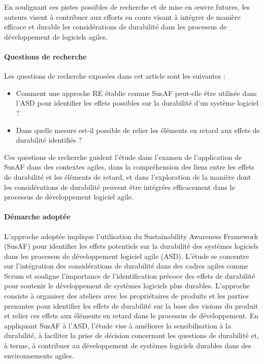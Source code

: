 En soulignant ces pistes possibles de recherche et de mise en œuvre futures, les auteurs visent à contribuer aux efforts en cours visant à intégrer de manière efficace et durable les considérations de durabilité dans les processus de développement de logiciels agiles.

\paragraph{Questions de recherche}
Les questions de recherche exposées dans cet article sont les suivantes :

\begin{itemize}
    \item Comment une approche RE établie comme SusAF peut-elle être utilisée dans l'ASD pour identifier les effets possibles sur la durabilité d'un système logiciel ?
    \item Dans quelle mesure est-il possible de relier les éléments en retard aux effets de durabilité identifiés ?
\end{itemize}

Ces questions de recherche guident l'étude dans l'examen de l'application de SusAF dans des contextes agiles, dans la compréhension des liens entre les effets de durabilité et les éléments de retard, et dans l'exploration de la manière dont les considérations de durabilité peuvent être intégrées efficacement dans le processus de développement logiciel agile.

\paragraph{Démarche adoptée}
L'approche adoptée implique l'utilisation du Sustainability Awareness Framework (SusAF) pour identifier les effets potentiels sur la durabilité des systèmes logiciels dans les processus de développement logiciel agile (ASD). L'étude se concentre sur l'intégration des considérations de durabilité dans des cadres agiles comme Scrum et souligne l'importance de l'identification précoce des effets de durabilité pour soutenir le développement de systèmes logiciels plus durables. L'approche consiste à organiser des ateliers avec les propriétaires de produits et les parties prenantes pour identifier les effets de durabilité sur la base des visions du produit et relier ces effets aux éléments en retard dans le processus de développement. En appliquant SusAF à l'ASD, l'étude vise à améliorer la sensibilisation à la durabilité, à faciliter la prise de décision concernant les questions de durabilité et, à terme, à contribuer au développement de systèmes logiciels durables dans des environnements agiles.

